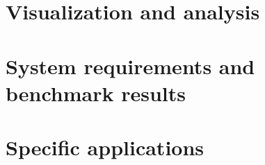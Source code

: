 \documentclass[a4paper,11pt]{report}
\newcommand{\NextFile}[1]{}
\def\umbruch{\vfill\eject}
\def\umbruch{\relax}
\begin{document}
\chapter{Visualization and analysis}
%
\NextFile{SystemRequirements.html}
\chapter{System requirements and benchmark results}

%
\NextFile{PolicyMeasures.html}
\chapter{Specific applications}


%






\umbruch
\end{document}
